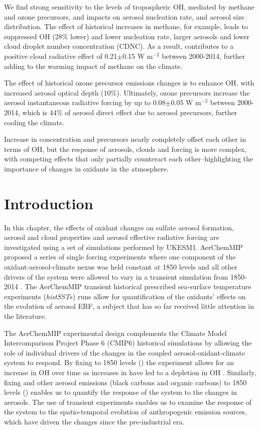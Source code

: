 We find strong sensitivity to the levels of tropospheric OH, mediated by methane and ozone precursors, and impacts on aerosol nucleation rate, and aerosol size distribution. The effect of historical increases in methane, for example, leads to suppressed OH (28\% lower) and lower nucleation rate, larger aerosols and lower cloud droplet number concentration (CDNC). As a result, contributes to a positive cloud radiative effect of 0.21$\pm$0.15 W m$^{-2}$ between 2000-2014, further adding to the warming impact of methane on the climate.

The effect of historical ozone precursor emissions changes is to enhance OH, with increased aerosol optical depth (10\%). Ultimately, ozone precursors increase the aerosol instantaneous radiative forcing by up to 0.08$\pm$0.05 W m$^{-2}$ between 2000-2014, which is 44\% of aerosol direct effect due to aerosol precursors, further cooling the climate.

Increase in  concentration and  precursors nearly completely offset each other in terms of OH, but the response of aerosols, clouds and forcing is more complex, with competing effects that only partially counteract each other--highlighting the importance of changes in oxidants in the atmosphere.


\section{Introduction}

In this chapter, the effects of oxidant changes on sulfate aerosol formation, aerosol and cloud properties and aerosol effective radiative forcing are investigated using a set of simulations performed by UKESM1. AerChemMIP proposed a series of single forcing experiments where one component of the oxidant-aerosol-climate nexus was held constant at 1850 levels and all other drivers of the system were allowed to vary in a transient simulation from 1850-2014 \citep{collinsAerChemMIPQuantifyingEffects2017}. The AerChemMIP transient historical prescribed sea-surface temperature experiments (\textit{histSST}s) runs allow for quantification of the oxidants' effects on the evolution of aerosol ERF, a subject that has so far received little attention in the literature. 

The AerChemMIP experimental design complements the Climate Model Intercomparison Project Phase 6 (CMIP6) historical simulations by allowing the role of individual drivers of the changes in the coupled aerosol-oxidant-climate system to respond. By fixing  to 1850 levels (\sstpich{}) the experiment allows for an increase in OH over time as increases in  have led to a depletion in OH \citep{zhaoRoleTrendVariability2020}. Similarly, fixing  and other aerosol emissions (black carbons and organic carbons) to 1850 levels (\sstpiaer{}) enables us to quantify the response of the system to the changes in aerosols. The use of transient experiments enables us to examine the response of the system to the spatio-temporal evolution of anthropogenic emission sources, which have driven the changes since the pre-industrial era. 



